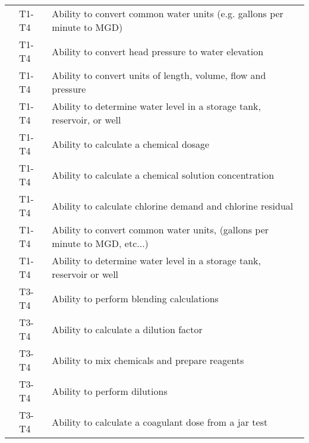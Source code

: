 \begin{table}[H]
\begin{tabular}{| m{1cm} | m{1cm} | m{12cm} |}
\multicolumn{1}{l|}{} & \multicolumn{1}{l|}{T1-T4} & Ability to convert   common water units (e.g. gallons per minute to MGD)     \\ \cline{2-3} 
\multicolumn{1}{l|}{} & \multicolumn{1}{l|}{T1-T4} & Ability to convert   head pressure to water elevation                        \\ \cline{2-3} 
\multicolumn{1}{l|}{} & \multicolumn{1}{l|}{T1-T4} & Ability to convert   units of length, volume, flow and pressure              \\ \cline{2-3} 
\multicolumn{1}{l|}{} & \multicolumn{1}{l|}{T1-T4} & Ability to determine   water level in a storage tank, reservoir, or well     \\ \cline{2-3} 
\multicolumn{1}{l|}{} & \multicolumn{1}{l|}{T1-T4} & Ability to calculate   a chemical dosage                                     \\ \cline{2-3} 
\multicolumn{1}{l|}{} & \multicolumn{1}{l|}{T1-T4} & Ability to calculate   a chemical solution concentration                     \\ \cline{2-3} 
\multicolumn{1}{l|}{} & \multicolumn{1}{l|}{T1-T4} & Ability to calculate   chlorine demand and chlorine residual                 \\ \cline{2-3} 
\multicolumn{1}{l|}{} & \multicolumn{1}{l|}{T1-T4} & Ability to convert   common water units, (gallons per minute to MGD, etc...) \\ \cline{2-3} 
\multicolumn{1}{l|}{} & \multicolumn{1}{l|}{T1-T4} & Ability to determine   water level in a storage tank, reservoir or well      \\ \cline{2-3} 
\multicolumn{1}{l|}{} & \multicolumn{1}{l|}{T3-T4} & Ability to perform   blending calculations                                   \\ \cline{2-3} 
\multicolumn{1}{l|}{} & \multicolumn{1}{l|}{T3-T4} & Ability to calculate   a dilution factor                                     \\ \cline{2-3} 
\multicolumn{1}{l|}{} & \multicolumn{1}{l|}{T3-T4} & Ability to mix   chemicals and prepare reagents                              \\ \cline{2-3} 
\multicolumn{1}{l|}{} & \multicolumn{1}{l|}{T3-T4} & Ability to perform   dilutions                                               \\ \cline{2-3} 
\multicolumn{1}{l|}{} & \multicolumn{1}{l|}{T3-T4} & Ability to calculate   a coagulant dose from a jar test                      \\ \cline{2-3} 

\end{tabular}
\end{table}
